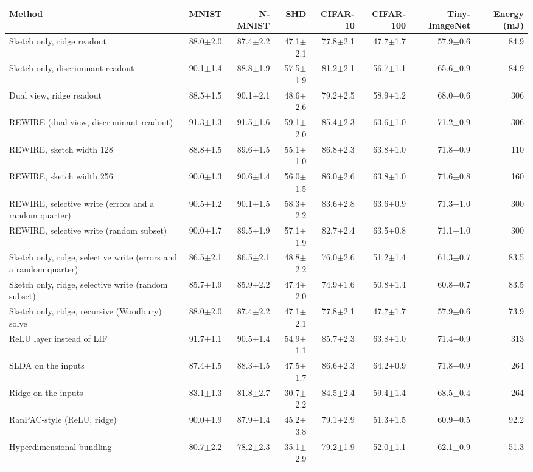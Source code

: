 \begin{tabular*}{\textwidth}{@{\extracolsep{\fill}}lrrrrrrr@{}}
\toprule
Method & MNIST & N-MNIST & SHD & CIFAR-10 & CIFAR-100 & Tiny-ImageNet & Energy (mJ) \\
\midrule
Sketch only, ridge readout & 88.0$\pm$2.0 & 87.4$\pm$2.2 & 47.1$\pm$2.1 & 77.8$\pm$2.1 & 47.7$\pm$1.7 & 57.9$\pm$0.6 & 84.9 \\
Sketch only, discriminant readout & 90.1$\pm$1.4 & 88.8$\pm$1.9 & 57.5$\pm$1.9 & 81.2$\pm$2.1 & 56.7$\pm$1.1 & 65.6$\pm$0.9 & 84.9 \\
Dual view, ridge readout & 88.5$\pm$1.5 & 90.1$\pm$2.1 & 48.6$\pm$2.6 & 79.2$\pm$2.5 & 58.9$\pm$1.2 & 68.0$\pm$0.6 & 306 \\
REWIRE (dual view, discriminant readout) & 91.3$\pm$1.3 & 91.5$\pm$1.6 & 59.1$\pm$2.0 & 85.4$\pm$2.3 & 63.6$\pm$1.0 & 71.2$\pm$0.9 & 306 \\
\midrule
REWIRE, sketch width 128 & 88.8$\pm$1.5 & 89.6$\pm$1.5 & 55.1$\pm$1.0 & 86.8$\pm$2.3 & 63.8$\pm$1.0 & 71.8$\pm$0.9 & 110 \\
REWIRE, sketch width 256 & 90.0$\pm$1.3 & 90.6$\pm$1.4 & 56.0$\pm$1.5 & 86.0$\pm$2.6 & 63.8$\pm$1.0 & 71.6$\pm$0.8 & 160 \\
REWIRE, selective write (errors and a random quarter) & 90.5$\pm$1.2 & 90.1$\pm$1.5 & 58.3$\pm$2.2 & 83.6$\pm$2.8 & 63.6$\pm$0.9 & 71.3$\pm$1.0 & 300 \\
REWIRE, selective write (random subset) & 90.0$\pm$1.7 & 89.5$\pm$1.9 & 57.1$\pm$1.9 & 82.7$\pm$2.4 & 63.5$\pm$0.8 & 71.1$\pm$1.0 & 300 \\
Sketch only, ridge, selective write (errors and a random quarter) & 86.5$\pm$2.1 & 86.5$\pm$2.1 & 48.8$\pm$2.2 & 76.0$\pm$2.6 & 51.2$\pm$1.4 & 61.3$\pm$0.7 & 83.5 \\
Sketch only, ridge, selective write (random subset) & 85.7$\pm$1.9 & 85.9$\pm$2.2 & 47.4$\pm$2.0 & 74.9$\pm$1.6 & 50.8$\pm$1.4 & 60.8$\pm$0.7 & 83.5 \\
Sketch only, ridge, recursive (Woodbury) solve & 88.0$\pm$2.0 & 87.4$\pm$2.2 & 47.1$\pm$2.1 & 77.8$\pm$2.1 & 47.7$\pm$1.7 & 57.9$\pm$0.6 & 73.9 \\
ReLU layer instead of LIF & 91.7$\pm$1.1 & 90.5$\pm$1.4 & 54.9$\pm$1.1 & 85.7$\pm$2.3 & 63.8$\pm$1.0 & 71.4$\pm$0.9 & 313 \\
SLDA on the inputs & 87.4$\pm$1.5 & 88.3$\pm$1.5 & 47.5$\pm$1.7 & 86.6$\pm$2.3 & 64.2$\pm$0.9 & 71.8$\pm$0.9 & 264 \\
Ridge on the inputs & 83.1$\pm$1.3 & 81.8$\pm$2.7 & 30.7$\pm$2.2 & 84.5$\pm$2.4 & 59.4$\pm$1.4 & 68.5$\pm$0.4 & 264 \\
RanPAC-style (ReLU, ridge) & 90.0$\pm$1.9 & 87.9$\pm$1.4 & 45.2$\pm$3.8 & 79.1$\pm$2.9 & 51.3$\pm$1.5 & 60.9$\pm$0.5 & 92.2 \\
Hyperdimensional bundling & 80.7$\pm$2.2 & 78.2$\pm$2.3 & 35.1$\pm$2.9 & 79.2$\pm$1.9 & 52.0$\pm$1.1 & 62.1$\pm$0.9 & 51.3 \\
\bottomrule
\end{tabular*}
